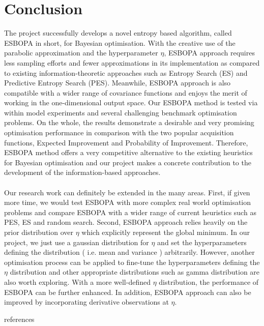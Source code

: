 \documentclass[a4paper,11pt]{report}
\begin{document}
\chapter{Conclusion}
The project successfully develops a novel entropy based algorithm, called ESBOPA in short, for Bayesian optimisation. With the creative use of the parabolic approximation and the hyperparameter $\eta$, ESBOPA approach requires less sampling efforts and fewer approximations in its implementation as compared to existing information-theoretic approaches such as Entropy Search (ES) and Predictive Entropy Search (PES). Meanwhile, ESBOPA approach is also compatible with a wider range of covariance functions and enjoys the merit of working in the one-dimensional output space. Our ESBOPA method is tested via within model experiments and several challenging benchmark optimisation problems. On the whole, the results demonstrate a desirable and very promising optimisation performance in comparison with the two popular acquisition functions, Expected Improvement and Probability of Improvement. Therefore, ESBOPA method offers a very competitive alternative to the existing heuristics for Bayesian optimisation and our project makes a concrete contribution to the development of the information-based approaches. 
\\\\
Our research work can definitely be extended in the many areas. First, if given more time, we would test ESBOPA with more complex real world optimisation problems and compare ESBOPA with a wider range of current heuristics such as PES, ES and random search. Second, ESBOPA approach relies heavily on the prior distribution over $\eta$ which explicitly represent the global minimum. In our project, we just use a gaussian distribution for $\eta$ and set the hyperparameters defining the distribution ( i.e. mean and variance ) arbitrarily. However, another optimisation process can be applied to fine-tune the hyperparameters defining the $\eta$ distribution and other appropriate distributions such as gamma distribution are also worth exploring. With a more well-defined $\eta$ distribution, the performance of ESBOPA can be further enhanced. In addition, ESBOPA approach can also be improved by incorporating derivative observations at $\eta$. 

{\small
{}
 {references}\clearpage}
\end{document}
